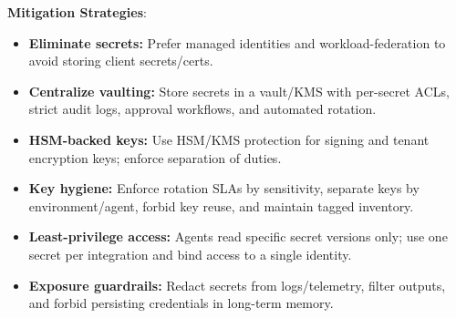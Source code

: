 \begin{TNtwocol}
    \textbf{Mitigation Strategies}:
    \begin{itemize}
        \item \textbf{Eliminate secrets:} Prefer managed identities and workload-federation to avoid storing client secrets/certs.
        \item \textbf{Centralize vaulting:} Store secrets in a vault/KMS with per-secret ACLs, strict audit logs, approval workflows, and automated rotation.
        \item \textbf{HSM-backed keys:} Use HSM/KMS protection for signing and tenant encryption keys; enforce separation of duties.
        \item \textbf{Key hygiene:} Enforce rotation SLAs by sensitivity, separate keys by environment/agent, forbid key reuse, and maintain tagged inventory.
        \item \textbf{Least-privilege access:} Agents read specific secret versions only; use one secret per integration and bind access to a single identity.
        \item \textbf{Exposure guardrails:} Redact secrets from logs/telemetry, filter outputs, and forbid persisting credentials in long-term memory.
    \end{itemize}

\end{TNtwocol}